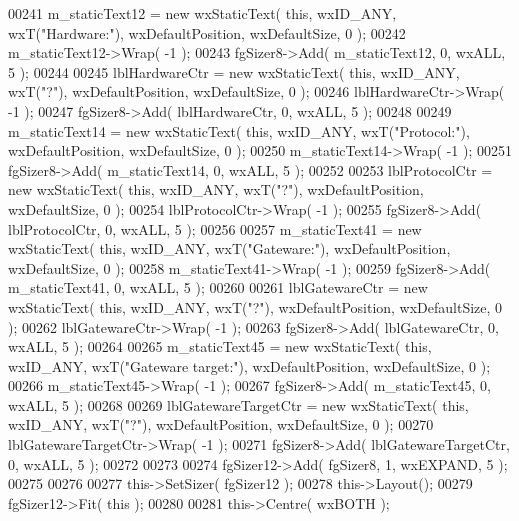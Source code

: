 \begin{DoxyCode}
00241     m_staticText12 = \textcolor{keyword}{new} wxStaticText( \textcolor{keyword}{this}, wxID\_ANY, wxT(\textcolor{stringliteral}{"Hardware:"}), wxDefaultPosition, wxDefaultSize, 
      0 );
00242     m_staticText12->Wrap( -1 );
00243     fgSizer8->Add( m_staticText12, 0, wxALL, 5 );
00244     
00245     lblHardwareCtr = \textcolor{keyword}{new} wxStaticText( \textcolor{keyword}{this}, wxID\_ANY, wxT(\textcolor{stringliteral}{"?"}), wxDefaultPosition, wxDefaultSize, 0 );
00246     lblHardwareCtr->Wrap( -1 );
00247     fgSizer8->Add( lblHardwareCtr, 0, wxALL, 5 );
00248     
00249     m_staticText14 = \textcolor{keyword}{new} wxStaticText( \textcolor{keyword}{this}, wxID\_ANY, wxT(\textcolor{stringliteral}{"Protocol:"}), wxDefaultPosition, wxDefaultSize, 
      0 );
00250     m_staticText14->Wrap( -1 );
00251     fgSizer8->Add( m_staticText14, 0, wxALL, 5 );
00252     
00253     lblProtocolCtr = \textcolor{keyword}{new} wxStaticText( \textcolor{keyword}{this}, wxID\_ANY, wxT(\textcolor{stringliteral}{"?"}), wxDefaultPosition, wxDefaultSize, 0 );
00254     lblProtocolCtr->Wrap( -1 );
00255     fgSizer8->Add( lblProtocolCtr, 0, wxALL, 5 );
00256     
00257     m_staticText41 = \textcolor{keyword}{new} wxStaticText( \textcolor{keyword}{this}, wxID\_ANY, wxT(\textcolor{stringliteral}{"Gateware:"}), wxDefaultPosition, wxDefaultSize, 
      0 );
00258     m_staticText41->Wrap( -1 );
00259     fgSizer8->Add( m_staticText41, 0, wxALL, 5 );
00260     
00261     lblGatewareCtr = \textcolor{keyword}{new} wxStaticText( \textcolor{keyword}{this}, wxID\_ANY, wxT(\textcolor{stringliteral}{"?"}), wxDefaultPosition, wxDefaultSize, 0 );
00262     lblGatewareCtr->Wrap( -1 );
00263     fgSizer8->Add( lblGatewareCtr, 0, wxALL, 5 );
00264     
00265     m_staticText45 = \textcolor{keyword}{new} wxStaticText( \textcolor{keyword}{this}, wxID\_ANY, wxT(\textcolor{stringliteral}{"Gateware target:"}), wxDefaultPosition, 
      wxDefaultSize, 0 );
00266     m_staticText45->Wrap( -1 );
00267     fgSizer8->Add( m_staticText45, 0, wxALL, 5 );
00268     
00269     lblGatewareTargetCtr = \textcolor{keyword}{new} wxStaticText( \textcolor{keyword}{this}, wxID\_ANY, wxT(\textcolor{stringliteral}{"?"}), wxDefaultPosition, wxDefaultSize, 0 
      );
00270     lblGatewareTargetCtr->Wrap( -1 );
00271     fgSizer8->Add( lblGatewareTargetCtr, 0, wxALL, 5 );
00272     
00273     
00274     fgSizer12->Add( fgSizer8, 1, wxEXPAND, 5 );
00275     
00276     
00277     this->SetSizer( fgSizer12 );
00278     this->Layout();
00279     fgSizer12->Fit( \textcolor{keyword}{this} );
00280     
00281     this->Centre( wxBOTH );

\end{DoxyCode}
